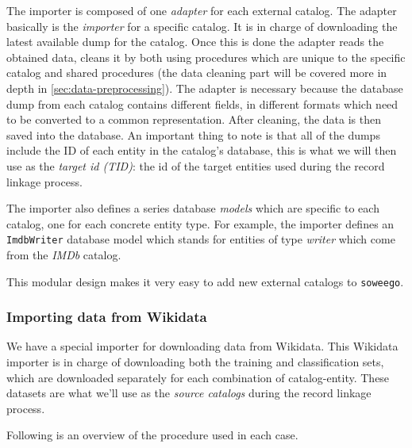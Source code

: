 \documentclass[epsfig,a4paper,11pt,titlepage,twoside,openany]{book}
\begin{document}
The importer is composed of one \textit{adapter} for each external catalog. The adapter basically is the \textit{importer} for a specific catalog. It is in charge of downloading the latest available dump for the catalog. Once this is done the adapter reads the obtained data, cleans it by both using procedures which are unique to the specific catalog and shared procedures (the data cleaning part will be covered more in depth in \autoref{sec:data-preprocessing}). The adapter is necessary because the database dump from each catalog contains different fields, in different formats which need to be converted to a common representation. After cleaning, the data is then saved into the database. An important thing to note is that all of the dumps include the ID of each entity in the catalog's database, this is what we will then use as the \textit{target id (TID)}: the id of the target entities used during the  record linkage process.

The importer also defines a series database \textit{models} which are specific to each catalog, one for each concrete entity type. For example, the importer defines an \texttt{ImdbWriter} database model which stands for entities of type \textit{writer} which come from the \textit{IMDb} catalog.

This modular design makes it very easy to add new external catalogs to \texttt{soweego}.


\subsubsection{Importing data from Wikidata}
\label{sec:importing-from-wikidata}

We have a special importer for downloading data from Wikidata. This Wikidata importer is in charge of downloading both the training and classification sets, which are downloaded separately for each combination of catalog-entity. These datasets are what we'll use as the \textit{source catalogs} during the record linkage process.

Following is an overview of the procedure used in each case. 
\end{document}
